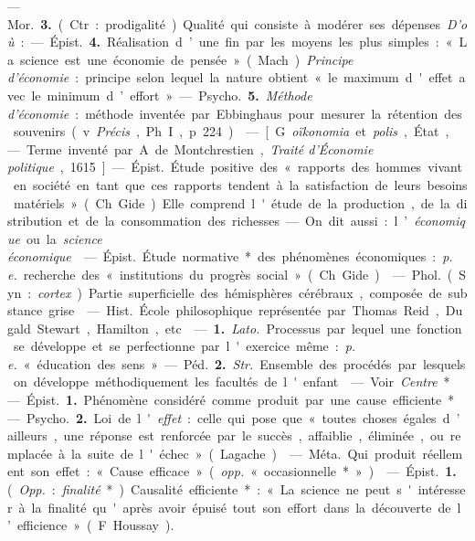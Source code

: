\begin{itemize}[leftmargin=1cm, label=, itemsep=1pt]
—  \si{Mor.} {\bf 3.} (Ctr. : prodigalité).
Qualité qui consiste à modérer ses
dépenses. {\it D’où} : — \si{Épist.} {\bf 4.} Réalisation d’une fin par les moyens les
plus simples : « La science est une
économie de pensée » (Mach). {\it Principe
d'économie} : principe selon
lequel la nature obtient « le maximum d'effet avec le minimum d’effort ».
— \si{Psycho.} {\bf 5.} {\it Méthode d’économie} : méthode inventée par
Ebbinghaus pour mesurer la rétention des
souvenirs (v.  {\it Précis}, Ph. I, p. 224).

 — [G. {\it oïkonomia} et
{\it polis}, État, — Terme inventé par
A. de Montchrestien, {\it Traité d'Économie politique}, 1615] — \si{Épist.}
Étude positive des « rapports des hommes vivant en société en tant
que ces rapports tendent à la satisfaction de leurs besoins matériels »
(Ch. Gide). Elle comprend l'étude de la production, de la distribution et
de la consommation des richesses. —
On dit aussi : l’{\it économique} ou la {\it science économique}.

 — \si{Épist.} Étude
normative* des phénomènes économiques : {\it p. e.} recherche des
« institutions du progrès social » (Ch. Gide).

 — \si{Phol.} (Syn. : {\it cortex}). Partie
superficielle des hémisphères cérébraux, composée de substance grise.

 — \si{Hist.} École
philosophique représentée par Thomas Reid, Dugald Stewart, Hamilton, etc.

 — {\bf 1.} {\it Lato.} Processus par
lequel une fonction se développe et se perfectionne par l'exercice même :
{\it p. e.} « éducation des sens ».

— \si{Péd.} {\bf 2.} {\it Str.} Ensemble des
procédés par lesquels on développe
méthodiquement les facultés de l'enfant.

 — Voir {\it Centre}*.

 — \si{Épist.} {\bf 1.} Phénomène considéré comme produit par
une cause efficiente*. — \si{Psycho.} {\bf 2.} Loi de
l'{\it effet} : celle qui pose que « toutes
choses égales d’ailleurs, une réponse
est renforcée par le succès, affaiblie,
éliminée, ou remplacée à la suite de l'échec » (Lagache).

 — \si{Méta.} Qui produit réellement son effet : « Cause efficace »
({\it opp.} « occasionnelle* »).

 — \si{Épist.} {\bf 1.} ({\it Opp.} : {\it finalité}*).
Causalité efficiente* : « La
science ne peut s'intéresser à la finalité qu'après avoir épuisé tout son
effort dans la découverte de l’efficience » (F. Houssay).


\end{itemize}
